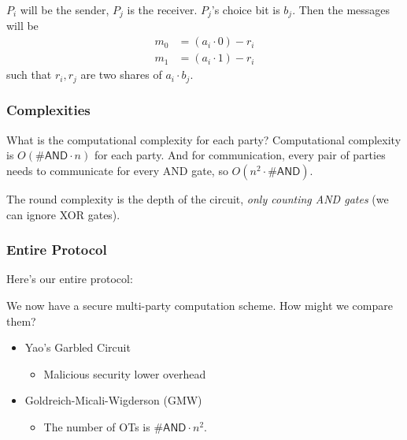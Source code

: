 $P_i$ will be the sender, $P_j$ is the receiver. $P_j$'s choice bit is $b_j$. Then the messages will be
\begin{align*}
    m_0 & = (a_i\cdot 0) - r_i \\
    m_1 & = (a_i\cdot 1) - r_i
\end{align*}
such that $r_i, r_j$ are two shares of $a_i\cdot b_j$.

\subsubsection{Complexities}
What is the computational complexity for each party? Computational complexity is $O(\#\mathsf{AND}\cdot n)$ for each party. And for communication, every pair of parties needs to communicate for every \textsf{AND} gate, so $O(n^2\cdot \#\mathsf{AND})$.

The round complexity is the depth of the circuit, \emph{only counting \textsf{AND} gates} (we can ignore \textsf{XOR} gates).

\subsubsection{Entire Protocol}

Here's our entire protocol:

We now have a secure multi-party computation scheme. How might we compare them?

\begin{itemize}
    \item Yao's Garbled Circuit
          \begin{itemize}
              \item Malicious security lower overhead
          \end{itemize}
    \item Goldreich-Micali-Wigderson (GMW)
          \begin{itemize}
              \item The number of OTs is $\#\mathsf{AND}\cdot n^2$.
          \end{itemize}
\end{itemize}